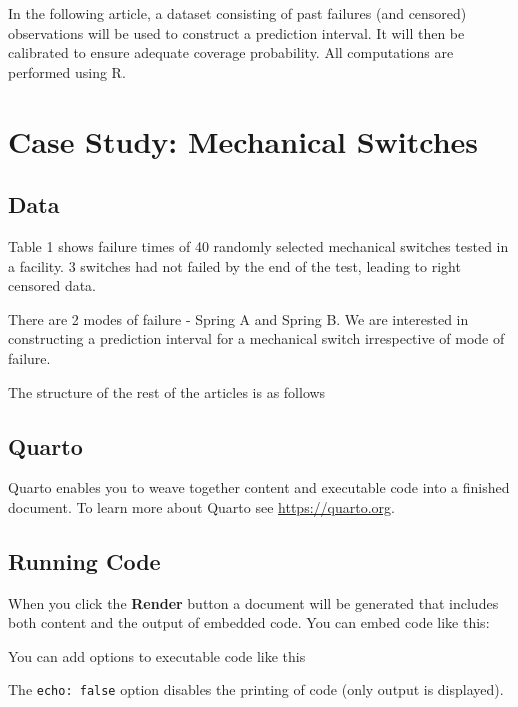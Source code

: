 \documentclass[
  letterpaper,
  DIV=11,
  numbers=noendperiod,
  oneside]{scrartcl}
\begin{document}
In the following article, a dataset consisting of past failures (and
censored) observations will be used to construct a prediction interval.
It will then be calibrated to ensure adequate coverage
probability. All
computations are performed using R.

\section{Case Study: Mechanical
Switches}\label{case-study-mechanical-switches}

\subsection{Data}\label{data}

Table 1 shows failure times of 40 randomly selected mechanical switches
tested in a facility. 3 switches had not failed by the end of the test,
leading to right censored data.

There are 2 modes of failure - Spring A and Spring B. We are interested
in constructing a prediction interval for a mechanical switch
irrespective of mode of failure.

The structure of the rest of the articles is as follows

\subsection{Quarto}\label{quarto}

Quarto enables you to weave together content and executable code into a
finished document. To learn more about Quarto see
\url{https://quarto.org}.

\subsection{Running Code}\label{running-code}

When you click the \textbf{Render} button a document will be generated
that includes both content and the output of embedded code. You can
embed code like this:

You can add options to executable code like this

The \texttt{echo:\ false} option disables the printing of code (only
output is displayed).
\end{document}
